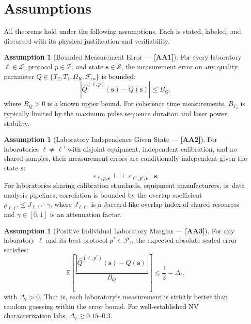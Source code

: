 \documentclass[11pt,a4paper]{article}
\theoremstyle{definition}
\newtheorem{assumption}[theorem]{Assumption}
\newcommand{\E}{\mathbb{E}}
\newcommand{\cL}{\mathcal{L}}
\newcommand{\cP}{\mathcal{P}}
\newcommand{\cS}{\mathcal{S}}
\newcommand{\Ttwo}{T_2}
\newcommand{\Tone}{T_1}
\newcommand{\NV}{NV}
\newcommand{\RabiFreq}{\Omega_R}
\newcommand{\FidReadout}{\mathcal{F}_{\text{ro}}}
\newcommand{\assumptionTag}[1]{\textsf{\textbf{[A#1]}}}
\begin{document}
\section{Assumptions }
\label{sec:assumptions}

All theorems hold under the following assumptions. Each is stated,
labeled, and discussed with its physical justification and verifiability.

\begin{assumption}[Bounded Measurement Error — \assumptionTag{A1}]
\label{ass:A1}
For every laboratory $\ell \in \cL$, protocol $p \in \cP$, and state
$\mathbf{s} \in \cS$, the measurement error on any quality parameter
$Q \in \{\Ttwo, \Tone, \RabiFreq, \FidReadout\}$ is bounded:
\begin{equation}
    |\widehat{Q}^{(\ell, p)}(\mathbf{s}) - Q(\mathbf{s})| \leq B_Q,
\end{equation}
where $B_Q > 0$ is a known upper bound. For coherence time measurements,
$B_{\Ttwo}$ is typically limited by the maximum pulse sequence duration
and laser power stability.
\end{assumption}

\begin{assumption}[Laboratory Independence Given State — \assumptionTag{A2}]
\label{ass:A2}
For laboratories $\ell \neq \ell'$ with disjoint equipment,
independent calibration, and no shared samples, their measurement
errors are conditionally independent given the state $\mathbf{s}$:
\begin{equation}
    \varepsilon_{\ell, p, \mathbf{s}} \perp\!\!\!\perp \varepsilon_{\ell', p', \mathbf{s}} \mid \mathbf{s}.
\end{equation}
For laboratories sharing calibration standards, equipment manufacturers,
or data analysis pipelines, correlation is bounded by the overlap
coefficient $\rho_{\ell\ell'} \leq J_{\ell\ell'} \cdot \gamma$,
where $J_{\ell\ell'}$ is a Jaccard-like overlap index of shared
resources and $\gamma \in [0,1]$ is an attenuation factor.
\end{assumption}

\begin{assumption}[Positive Individual Laboratory Margins — \assumptionTag{A3}]
\label{ass:A3}
For any laboratory $\ell$ and its best protocol $p^* \in \cP_\ell$,
the expected absolute scaled error satisfies:
\begin{equation}
    \E\left[\frac{|\widehat{Q}^{(\ell, p^*)}(\mathbf{s}) - Q(\mathbf{s})|}{B_Q}\right]
    \leq \frac{1}{2} - \Delta_\ell,
\end{equation}
with $\Delta_\ell > 0$. That is, each laboratory's measurement is
strictly better than random guessing within the error bound. For
well-established \NV{} characterization labs, $\Delta_\ell \gtrsim 0.15$--$0.3$.
\end{assumption}
\end{document}
